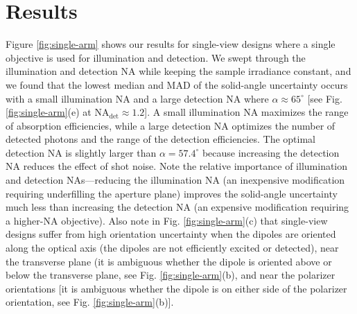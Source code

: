 \documentclass[10pt]{article}
\begin{document}
\section{Results}\label{results}
Figure \ref{fig:single-arm} shows our results for single-view designs where a
single objective is used for illumination and detection. We swept through the
illumination and detection NA while keeping the sample irradiance constant, and
we found that the lowest median and MAD of the solid-angle uncertainty occurs
with a small illumination NA and a large detection NA where
$\alpha \approx 65^{\circ}$ {\color{urlblue}[}see {\color{urlblue}Fig.} \ref{fig:single-arm}{\color{urlblue}(e)} at
NA${}_{\text{det}} \approx 1.2${\color{urlblue}]}. A small illumination NA maximizes the range of
absorption efficiencies, while a large detection NA optimizes the number of
detected photons and the range of the detection efficiencies. The optimal
detection NA is slightly larger than $\alpha = 57.4^{\circ}$ because increasing
the detection NA reduces the effect of shot noise. Note the relative importance
of illumination and detection NAs---reducing the illumination NA (an inexpensive
modification requiring underfilling the aperture plane) improves the solid-angle
uncertainty much less than increasing the detection NA (an expensive
modification requiring a higher-NA objective). Also note in {\color{urlblue}Fig.}
\ref{fig:single-arm}{\color{urlblue}(c)} that single-view designs suffer from high orientation
uncertainty when the dipoles are oriented along the optical axis (the
dipoles are not efficiently excited or detected), near the transverse plane
(it is ambiguous whether the dipole is oriented above or below the transverse
plane, see {\color{urlblue}Fig.} \ref{fig:single-arm}{\color{urlblue}(b)}, and near the polarizer orientations
{\color{urlblue}[}it is ambiguous whether the dipole is on either side of the polarizer
orientation, see {\color{urlblue}Fig.} \ref{fig:single-arm}{\color{urlblue}(b)}{\color{urlblue}]}.
\end{document}
